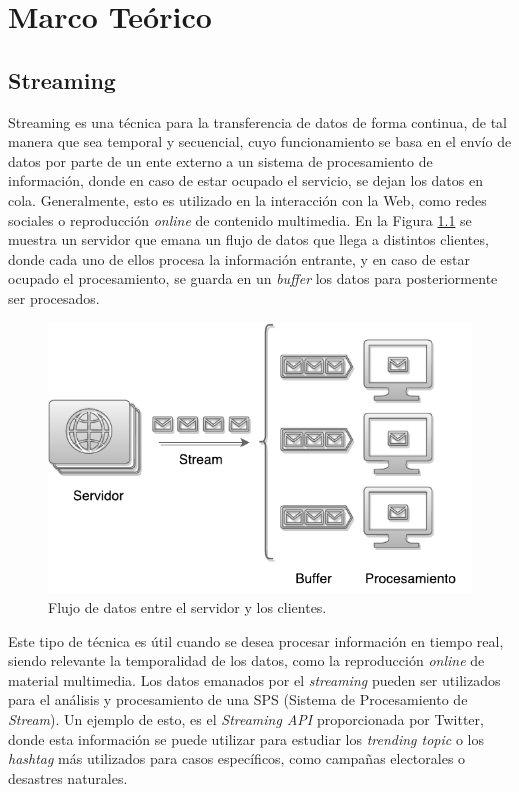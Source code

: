 \chapter{Marco Teórico}
\label{cap:marcoTeorico}

\section{Streaming}
\label{sec:streaming}

Streaming es una técnica para la transferencia de datos de forma continua, de tal manera que sea temporal y secuencial, cuyo funcionamiento se basa en el envío de datos por parte de un ente externo a un sistema de procesamiento de información, donde en caso de estar ocupado el servicio, se dejan los datos en cola. Generalmente, esto es utilizado en la interacción con la Web, como redes sociales o reproducción \textit{online} de contenido multimedia. En la Figura \ref{fig:streaming} se muestra un servidor que emana un flujo de datos que llega a distintos clientes, donde cada uno de ellos procesa la información entrante, y en caso de estar ocupado el procesamiento, se guarda en un \textit{buffer} los datos para posteriormente ser procesados.

\begin{figure}[ht!]
  \centering
    \includegraphics[scale=0.7]{images/Streaming.pdf}
  \caption{Flujo de datos entre el servidor y los clientes.}
  \label{fig:streaming}
\end{figure}

Este tipo de técnica es útil cuando se desea procesar información en tiempo real, siendo relevante la temporalidad de los datos, como la reproducción \textit{online} de material multimedia. Los datos emanados por el \textit{streaming} pueden ser utilizados para el análisis y procesamiento de una SPS (Sistema de Procesamiento de \textit{Stream}). Un ejemplo de esto, es el \textit{Streaming API} proporcionada por Twitter, donde esta información se puede utilizar para estudiar los \textit{trending topic} o los \textit{hashtag} más utilizados para casos específicos, como campañas electorales o desastres naturales.


